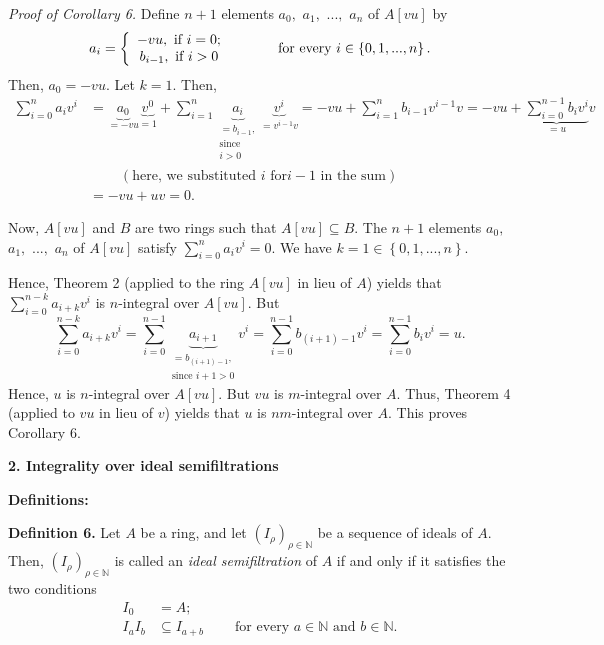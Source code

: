 \documentclass[12pt,final,notitlepage,onecolumn]{article}%
\begin{document}
\textit{Proof of Corollary 6.} Define $n+1$ elements $a_{0},$ $a_{1},$ $...,$
$a_{n}$ of $A\left[  vu\right]  $ by%
\[
a_{i}=\left\{
\begin{array}
[c]{c}%
-vu,\text{ if }i=0;\\
b_{i-1},\text{ if }i>0
\end{array}
\right.  \ \ \ \ \ \ \ \ \ \ \text{for every }i\in\left\{  0,1,...,n\right\}
.
\]
Then, $a_{0}=-vu$. Let $k=1$. Then,%
\begin{align*}
\sum\limits_{i=0}^{n}a_{i}v^{i}  &  =\underbrace{a_{0}}_{=-vu}\underbrace
{v^{0}}_{=1}+\sum\limits_{i=1}^{n}\underbrace{a_{i}}_{\substack{=b_{i-1}%
,\\\text{since}\\i>0}}\underbrace{v^{i}}_{=v^{i-1}v}=-vu+\sum\limits_{i=1}%
^{n}b_{i-1}v^{i-1}v=-vu+\underbrace{\sum\limits_{i=0}^{n-1}b_{i}v^{i}}_{=u}v\\
&  \ \ \ \ \ \ \ \ \ \ \left(  \text{here, we substituted }i\text{ for
}i-1\text{\ in the sum}\right) \\
&  =-vu+uv=0.
\end{align*}


Now, $A\left[  vu\right]  $ and $B$ are two rings such that $A\left[
vu\right]  \subseteq B$. The $n+1$ elements $a_{0},$ $a_{1},$ $...,$ $a_{n}$
of $A\left[  vu\right]  $ satisfy $\sum\limits_{i=0}^{n}a_{i}v^{i}=0$. We have
$k=1\in\left\{  0,1,...,n\right\}  .$

Hence, Theorem 2 (applied to the ring $A\left[  vu\right]  $ in lieu of $A$)
yields that $\sum\limits_{i=0}^{n-k}a_{i+k}v^{i}$ is $n$-integral over
$A\left[  vu\right]  $. But%
\[
\sum\limits_{i=0}^{n-k}a_{i+k}v^{i}=\sum\limits_{i=0}^{n-1}\underbrace
{a_{i+1}}_{\substack{=b_{\left(  i+1\right)  -1},\\\text{since }i+1>0}%
}v^{i}=\sum\limits_{i=0}^{n-1}b_{\left(  i+1\right)  -1}v^{i}=\sum
\limits_{i=0}^{n-1}b_{i}v^{i}=u.
\]
Hence, $u$ is $n$-integral over $A\left[  vu\right]  $. But $vu$ is
$m$-integral over $A$. Thus, Theorem 4 (applied to $vu$ in lieu of $v$) yields
that $u$ is $nm$-integral over $A$. This proves Corollary 6.

\begin{center}
\color{blue} \textbf{2. Integrality over ideal semifiltrations} \color{black}
\end{center}

\textbf{Definitions:}

\textbf{Definition 6.} Let $A$ be a ring, and let $\left(  I_{\rho}\right)
_{\rho\in\mathbb{N}}$ be a sequence of ideals of $A$. Then, $\left(  I_{\rho
}\right)  _{\rho\in\mathbb{N}}$ is called an \textit{ideal semifiltration} of
$A$ if and only if it satisfies the two conditions%
\begin{align*}
I_{0}  &  =A;\\
I_{a}I_{b}  &  \subseteq I_{a+b}\ \ \ \ \ \ \ \ \ \ \text{for every }%
a\in\mathbb{N}\text{ and }b\in\mathbb{N}.
\end{align*}
\end{document}

